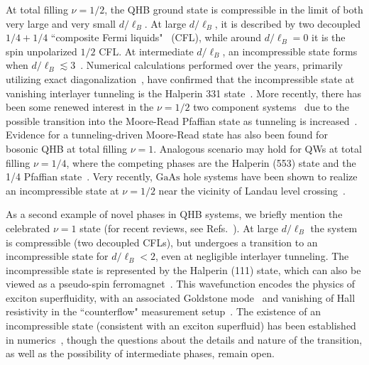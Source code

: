 At total filling $\nu=1/2$, the QHB ground state is compressible in the limit of both very large and very small $d/\ell_B$.
At large $d/\ell_B$, it is described by two decoupled $1/4+1/4$ ``composite Fermi liquids"~\cite{HalperinLeeRead} (CFL), while around $d/\ell_B=0$ it is the spin unpolarized $1/2$ CFL. 
At intermediate $d/\ell_B$, an incompressible state forms when $d/\ell_B \lesssim 3$~\cite{SuenOneHalf, EisensteinOneHalf}. 
Numerical calculations performed over the years, primarily utilizing exact diagonalization~\cite{Chakraborty87, Yoshioka89, He93, Scarola01, Peterson10_2}, have confirmed that the incompressible state at vanishing interlayer tunneling is the Halperin 331 state~\cite{Halperin83}. 
More recently, there has been some renewed interest in the $\nu=1/2$ two component systems~\cite{Shabani09, Shabani13} due to the possible transition into the Moore-Read Pfaffian state as tunneling is increased~\cite{Nomura04, Papic10, Peterson10}. 
Evidence for a tunneling-driven Moore-Read state has also been found for bosonic QHB at total filling $\nu=1$\cite{Zhu2015}.
Analogous scenario may hold for QWs at total filling $\nu=1/4$, where the competing phases are the Halperin (553) state and the 1/4 Pfaffian state~\cite{Papic09}.
Very recently, $\mathrm{GaAs}$ hole systems have been shown to realize an incompressible state at $\nu=1/2$ near the vicinity of Landau level crossing~\cite{Liu14}.      

As a second example of novel phases in QHB systems, we briefly mention the celebrated $\nu=1$ state (for recent reviews, see Refs.~\cite{EisensteinMacDonald, JimReview}). 
At large $d/\ell_B$ the system is compressible (two decoupled CFLs), but undergoes a transition to an incompressible state for $d/\ell_B<2$, even at negligible interlayer tunneling.
The incompressible state is represented by the Halperin (111) state, which can also be viewed as a pseudo-spin ferromagnet~\cite{GirvinMacDonald}. 
This wavefunction encodes the physics of exciton superfluidity, with an associated Goldstone mode~\cite{Spielman00} and vanishing of Hall resistivity in the ``counterflow" measurement setup~\cite{Kellogg04, Tutuc04}. 
The existence of an incompressible state (consistent with an exciton superfluid) has been established in numerics~\cite{Schliemann01, Simon03, Shibata06, Moller08, Papic11}, though the questions about the details and nature of the transition, as well as the possibility of intermediate phases, remain open.

